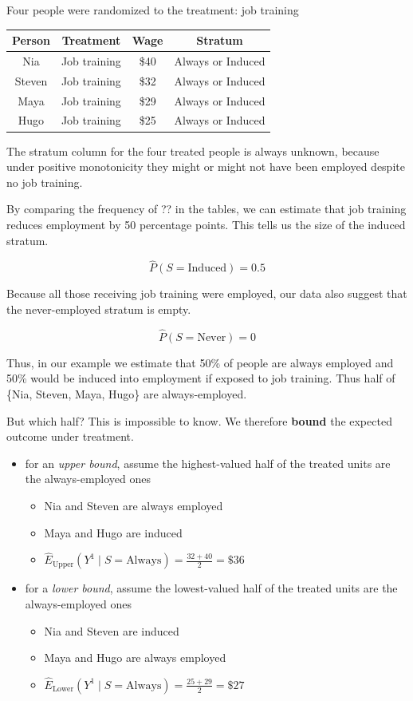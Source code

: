 \documentclass[
]{book}
\providecommand{\tightlist}{%
  \setlength{\itemsep}{0pt}\setlength{\parskip}{0pt}}
\begin{document}
Four people were randomized to the treatment: job training

\begin{longtable}[]{@{}cccc@{}}
\toprule\noalign{}
Person & Treatment & Wage & Stratum \\
\midrule\noalign{}
\endhead
\bottomrule\noalign{}
\endlastfoot
Nia & Job training & \$40 & Always or Induced \\
Steven & Job training & \$32 & Always or Induced \\
Maya & Job training & \$29 & Always or Induced \\
Hugo & Job training & \$25 & Always or Induced \\
\end{longtable}

The stratum column for the four treated people is always unknown, because under positive monotonicity they might or might not have been employed despite no job training.

By comparing the frequency of ?? in the tables, we can estimate that job training reduces employment by 50 percentage points. This tells us the size of the induced stratum.

\[\hat{P}(S = \text{Induced}) = 0.5\]

Because all those receiving job training were employed, our data also suggest that the never-employed stratum is empty.

\[\hat{P}(S = \text{Never}) = 0\]

Thus, in our example we estimate that 50\% of people are always employed and 50\% would be induced into employment if exposed to job training. Thus half of \{Nia, Steven, Maya, Hugo\} are always-employed.

But which half? This is impossible to know. We therefore \textbf{bound} the expected outcome under treatment.

\begin{itemize}
\tightlist
\item
  for an \emph{upper bound}, assume the highest-valued half of the treated units are the always-employed ones

  \begin{itemize}
  \tightlist
  \item
    Nia and Steven are always employed
  \item
    Maya and Hugo are induced
  \item
    \(\hat{E}_\text{Upper}(Y^1\mid S = \text{Always}) = \frac{32+40}{2} = \$36\)
  \end{itemize}
\item
  for a \emph{lower bound}, assume the lowest-valued half of the treated units are the always-employed ones

  \begin{itemize}
  \tightlist
  \item
    Nia and Steven are induced
  \item
    Maya and Hugo are always employed
  \item
    \(\hat{E}_\text{Lower}(Y^1\mid S = \text{Always}) = \frac{25+29}{2} = \$27\)
  \end{itemize}
\end{itemize}
\end{document}
